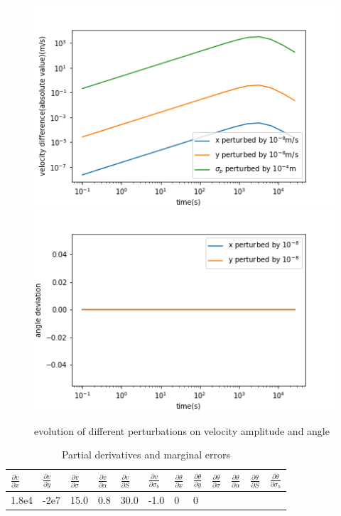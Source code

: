 \documentclass{article}
\begin{document}
	\begin{figure}[]
		\centering
		\includegraphics[width=12cm]{pert.png}
		\includegraphics[width=12cm]{pertang.png}
		
		\caption{evolution of different perturbations on velocity amplitude and angle}
		\label{sim1}
	\end{figure}
	
		\begin{table}[!htb]
		\centering
		\label{pd}
		\caption{Partial derivatives and marginal errors}
		\begin{tabular}{llllllllllll}
			\toprule
			$\frac{\partial v}{\partial x}$ &$\frac{\partial v}{\partial y}$ &$\frac{\partial v}{\partial \sigma}$ &$\frac{\partial v}{\partial \alpha}$ &$\frac{\partial v}{\partial S}$ &$\frac{\partial v}{\partial \sigma_b}$& $\frac{\partial \theta}{\partial x}$ &$\frac{\partial \theta}{\partial y}$ &$\frac{\partial \theta}{\partial \sigma}$ &$\frac{\partial \theta}{\partial \alpha}$ &$\frac{\partial \theta}{\partial S}$ &$\frac{\partial \theta}{\partial \sigma_b}$	\\
			\midrule
			1.8e4 &	-2e7	& 15.0	& 0.8	&30.0	& -1.0 &0&0		\\
			\bottomrule
		\end{tabular}

	\end{table}
	
\end{document}

